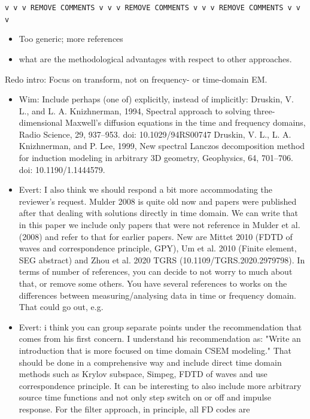 \documentclass[onecolumn,extra,referee,camera]{gji}
\begin{document}
{\color{alizarin}
\verb!v v v REMOVE COMMENTS v v v REMOVE COMMENTS v v v REMOVE COMMENTS v v v!
}
{\color{mygreen}
\begin{itemize}
  \item Too generic; more references
  \item what are the methodological advantages with respect to other
    approaches.
\end{itemize}

Redo intro: Focus on transform, not on frequency- or time-domain EM.

\begin{itemize}
  \item Wim: Include perhaps (one of) explicitly, instead of implicitly:
    Druskin, V. L., and L. A. Knizhnerman, 1994, Spectral approach to solving
    three-dimensional Maxwell’s diffusion equations in the time and frequency
    domains, Radio Science, 29, 937--953. doi: 10.1029/94RS00747 Druskin, V.
    L., L. A. Knizhnerman, and P. Lee, 1999, New spectral Lanczos decomposition
    method for induction modeling in arbitrary 3D geometry, Geophysics, 64,
    701--706. doi: 10.1190/1.1444579.
  \item Evert: I also think we should respond a bit more accommodating the
    reviewer's request. Mulder 2008 is quite old now and papers were published
    after that dealing with solutions directly in time domain. We can write
    that in this paper we include only papers that were not reference in Mulder
    et al. (2008) and refer to that for earlier papers. New are Mittet 2010
    (FDTD of waves and correspondence principle, GPY), Um et al. 2010 (Finite
    element, SEG abstract) and Zhou et al. 2020 TGRS
    (10.1109/TGRS.2020.2979798). In terms of number of references, you can
    decide to not worry to much about that, or remove some others. You have
    several references to works on the differences between measuring/analysing
    data in time or frequency domain. That could go out, e.g.
  \item Evert: i think you can group separate points under the recommendation
    that comes from his first concern. I understand his recommendation as:
    "Write an introduction that is more focused on time domain CSEM modeling."
    That should be done in a comprehensive way and include direct time domain
    methods such as Krylov subspace, Simpeg, FDTD of waves and use
    correspondence principle. It can be interesting to also include more
    arbitrary source time functions and not only step switch on or off and
    impulse response. For the filter approach, in principle, all FD codes are

\end{itemize}}
\end{document}
